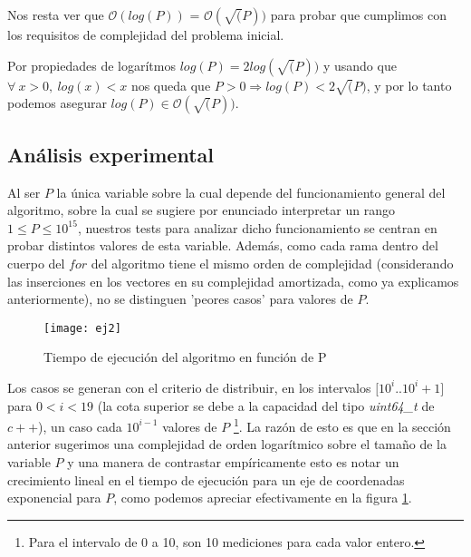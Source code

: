	Nos resta ver que $\mathcal{O} (log(P))$ = $\mathcal{O} (\sqrt(P))$ para probar que cumplimos con los requisitos de complejidad del problema inicial.
	
	Por propiedades de logarítmos $log(P) = 2log(\sqrt(P))$ y usando que $\forall \ x > 0, \ log(x) < x$ nos queda que $ P > 0 \Longrightarrow log(P) < 2\sqrt(P)$, y por lo tanto podemos asegurar $log(P) \in \mathcal{O} (\sqrt(P))$. 

\subsection{Análisis experimental}

	Al ser $P$ la única variable sobre la cual depende del funcionamiento general del algoritmo, sobre la cual se sugiere por enunciado interpretar un rango $1 \leq P \leq 10^{15}$, nuestros tests para analizar dicho funcionamiento se centran en probar distintos valores de esta variable. Además, como cada rama dentro del cuerpo del $for$ del algoritmo tiene el mismo orden de complejidad (considerando las inserciones en los vectores en su complejidad amortizada, como ya explicamos anteriormente), no se distinguen 'peores casos' para valores de $P$.
	\\

\begin{figure}[H]
    \centering
    \texttt{[image: ej2]}
    \caption{Tiempo de ejecución del algoritmo en función de P}
    \label{fig:ej2-fig}
\end{figure}

Los casos se generan con el criterio de distribuir, en los intervalos $[10^i$..$10^i+1]$ para $0 < i < 19$ (la cota superior se debe a la capacidad del tipo \emph{uint64_t} de $c++$), un caso cada $10^{i-1}$ valores de $P$ \footnote{Para el intervalo de 0 a 10, son 10 mediciones para cada valor entero.}. La razón de esto es que en la sección anterior sugerimos una complejidad de orden logarítmico sobre el tamaño de la variable $P$ y una manera de contrastar empíricamente esto es notar un crecimiento lineal en el tiempo de ejecución para un eje de coordenadas exponencial para $P$, como podemos apreciar efectivamente en la figura \ref{fig:ej2-fig}.

